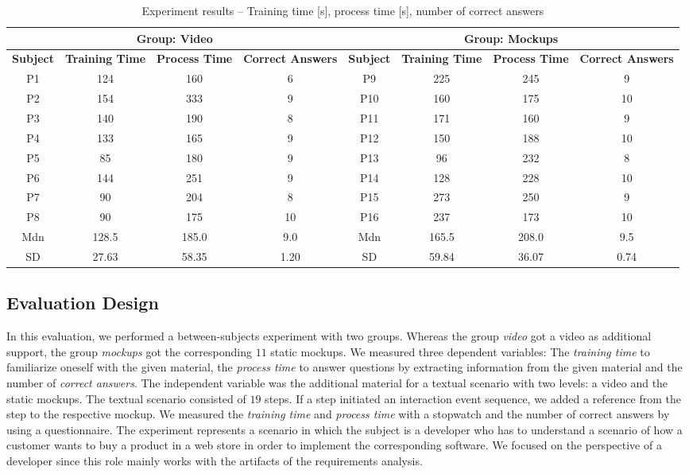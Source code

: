 \documentclass[conference]{IEEEtran}
\begin{document}
\begin{table*}[!b]
	\centering
	\caption{Experiment results -- Training time [s], process time [s], number 
		of correct answers}
	\label{experiment_results}
	\begin{tabular}{|c|c|c|c||c|c|c|c|}
		\hline
		\multicolumn{4}{|c||}{\textbf{Group: Video}} & 
		\multicolumn{4}{c|}{\textbf{Group: Mockups}} \\ \hline
		\textbf{Subject} & \textbf{Training Time} & \textbf{Process Time} & 
		\textbf{Correct Answers} & \textbf{Subject} & \textbf{Training Time} & 
		\textbf{Process Time} & \textbf{Correct Answers} \\ \hline \hline
		P1 & 124 & 160 & 6 & P9 & 225 & 245 & 9 \\ \hline
		P2 & 154 & 333 & 9 & P10 & 160 & 175 & 10 \\ \hline
		P3 & 140 & 190 & 8 & P11 & 171 & 160 & 9 \\ \hline
		P4 & 133 & 165 & 9 & P12 & 150 & 188 & 10 \\ \hline
		P5 & 85 & 180 & 9 & P13 & 96 & 232 & 8 \\ \hline
		P6 & 144 & 251 & 9 & P14 & 128 & 228 & 10 \\ \hline
		P7 & 90 & 204 & 8 & P15 & 273 & 250 & 9 \\ \hline
		P8 & 90 & 175 & 10 & P16 & 237 & 173 & 10 \\ \hline \hline
		Mdn & 128.5 & 185.0 & 9.0 & Mdn & 165.5 & 208.0 & 9.5 \\ \hline
		SD & 27.63 & 58.35 & 1.20 & SD & 59.84 & 36.07 & 0.74 \\ \hline
	\end{tabular}
\end{table*}

\subsection{Evaluation Design}
In this evaluation, we performed a between-subjects experiment with two groups. 
Whereas the group \textit{video} got a video as additional support, the 
group \textit{mockups} got the corresponding $11$ static mockups. We measured 
three dependent variables: The \textit{training time} to familiarize oneself 
with the given material, the \textit{process time} to answer questions by 
extracting information from the given material and the number of 
\textit{correct answers}. The independent variable was the additional material 
for a textual scenario with two levels: a video and the static mockups. The 
textual scenario consisted of $19$ steps. If a step initiated an interaction 
event sequence, we added a reference from the step to the respective mockup. We 
measured the \textit{training time} and \textit{process time} with a 
stopwatch and the number of correct answers by using a questionnaire. The 
experiment represents a scenario in which the subject is a developer who has to 
understand a scenario of how a customer wants to buy a product in a web store 
in order to implement the corresponding software. We focused on the perspective 
of a developer since this role mainly works with the artifacts of the 
requirements analysis.
\end{document}
